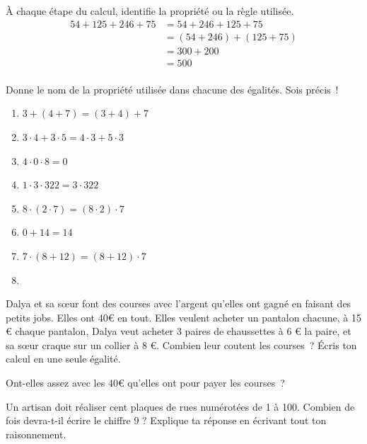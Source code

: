 \documentclass[syllabus_1.tex]{subfiles}
\begin{document}
\begin{exercise}
    À chaque étape du calcul, identifie la propriété ou la règle utilisée.
    \begin{align*}
        54 + 125 + 246 + 75
         & = 54 + 246 + 125 + 75     \\
         & = (54 + 246) + (125 + 75) \\
         & = 300 + 200               \\
         & = 500                     \\
    \end{align*}
\end{exercise}

\begin{exercise}
    Donne le nom de la propriété utilisée dans chacune des égalités. Sois précis~!
    \begin{enumerate}[cols=2]
        \item \(3+ (4+ 7)  = (3 + 4) + 7\)
        \item \(3 \cdot 4  +  3 \cdot 5  =  4 \cdot 3  +  5 \cdot 3\)
        \item \(4 \cdot 0 \cdot 8 = 0\)
        \item \(1 \cdot 3 \cdot 322  =  3 \cdot 322\)
        \item \(8 \cdot (2 \cdot 7) =  (8 \cdot 2) \cdot 7\)
        \item \(0  +  14  =  14\)
        \item \(7 \cdot (8  +  12) =  (8  +  12) \cdot 7\)
        \item[]
    \end{enumerate}
\end{exercise}

\begin{exercise}
    Dalya et sa sœur font des courses avec l'argent qu'elles ont gagné en
    faisant des petits jobs. Elles ont 40€ en tout. Elles veulent acheter
    un pantalon chacune, à 15 € chaque pantalon, Dalya veut acheter 3
    paires de chaussettes à 6 € la paire, et sa s\oe{}ur craque sur un collier
    à 8 €. Combien leur coutent les courses~? Écris ton calcul en une seule
    égalité.

    Ont-elles assez avec les 40€ qu'elles ont pour payer les courses~?
\end{exercise}

\begin{exercise}
    Un artisan doit réaliser cent plaques de rues numérotées de 1 à 100.
    Combien de fois devra-t-il écrire le chiffre 9 ? Explique ta réponse
    en écrivant tout ton raisonnement.
\end{exercise}
\end{document}
